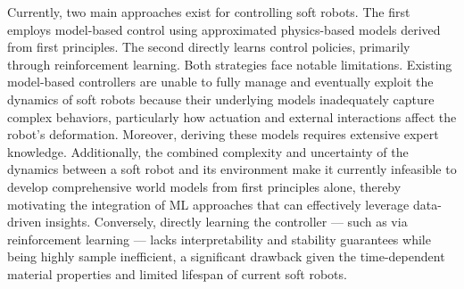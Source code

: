 Currently, two main approaches exist for controlling soft robots. The first employs model-based control using approximated physics-based models derived from first principles. The second directly learns control policies, primarily through reinforcement learning. Both strategies face notable limitations. Existing model-based controllers are unable to fully manage and eventually exploit the dynamics of soft robots because their underlying models inadequately capture complex behaviors, particularly how actuation and external interactions affect the robot’s deformation. Moreover, deriving these models requires extensive expert knowledge. Additionally, the combined complexity and uncertainty of the dynamics between a soft robot and its environment make it currently infeasible to develop comprehensive world models from first principles alone, thereby motivating the integration of \gls{ML} approaches that can effectively leverage data-driven insights. Conversely, directly learning the controller — such as via reinforcement learning — lacks interpretability and stability guarantees while being highly sample inefficient, a significant drawback given the time-dependent material properties and limited lifespan of current soft robots.

